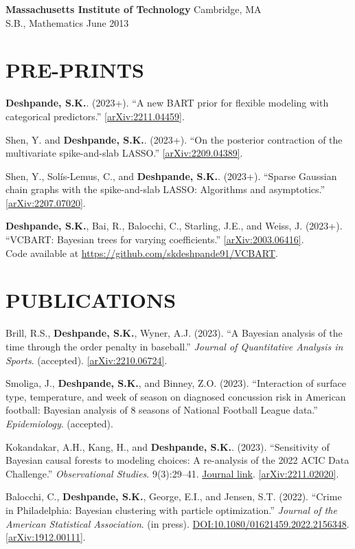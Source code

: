 \documentclass[margin]{res}
\def\skd{\textbf{Deshpande, S.K.}}
\begin{document}
\begin{resume}
                {\bf Massachusetts Institute of Technology} \hfill Cambridge, MA \\
                S.B., Mathematics \hfill June 2013 
  
  
\section{PRE-PRINTS}

\skd. (2023+). ``A new BART prior for flexible modeling with categorical predictors.'' \href{https://arxiv.org/abs/2211.04459}{[arXiv:2211.04459]}.

Shen, Y. and \skd. (2023+). ``On the posterior contraction of the multivariate spike-and-slab LASSO.'' \href{https://arxiv.org/abs/2209.04389}{[arXiv:2209.04389]}.

Shen, Y., Sol\'{i}s-Lemus, C., and \skd. (2023+). ``Sparse Gaussian chain graphs with the spike-and-slab LASSO: Algorithms and asymptotics.'' \href{https://arxiv.org/abs/2207.07020}{[arXiv:2207.07020]}.

\skd, Bai, R., Balocchi, C., Starling, J.E., and Weiss, J. (2023+). ``VCBART: Bayesian trees for varying coefficients.'' \href{https://arxiv.org/abs/2003.06416}{[arXiv:2003.06416]}. \\ Code available at \url{https://github.com/skdeshpande91/VCBART}.

\section{PUBLICATIONS}

Brill, R.S., \skd, Wyner, A.J. (2023). ``A Bayesian analysis of the time through the order penalty in baseball.'' \textit{Journal of Quantitative Analysis in Sports}. (accepted). \href{https://arxiv.org/abs/2210.06724}{[arXiv:2210.06724]}.

Smoliga, J., \skd, and Binney, Z.O. (2023). ``Interaction of surface type, temperature, and week of season on diagnosed concussion risk in American football: {Bayesian} analysis of 8 seasons of National Football League data.'' \textit{Epidemiology}. (accepted).

Kokandakar, A.H., Kang, H., and \skd. (2023). ``Sensitivity of Bayesian causal forests to modeling choices: A re-analysis of the 2022 ACIC Data Challenge.'' \textit{Observational Studies}. 9(3):29--41. \href{https://muse.jhu.edu/pub/56/article/895651}{Journal link}. \href{https://arxiv.org/abs/2211.02020}{[arXiv:2211.02020]}.

Balocchi, C., \skd, George, E.I., and Jensen, S.T. (2022). ``Crime in Philadelphia: Bayesian clustering with particle optimization.'' \textit{Journal of the American Statistical Association}. (in press).
\href{https://doi.org/10.1080/01621459.2022.2156348}{DOI:10.1080/01621459.2022.2156348}. \href{https://arxiv.org/abs/1912.00111}{[arXiv:1912.00111]}. 


\end{resume}
\end{document}

